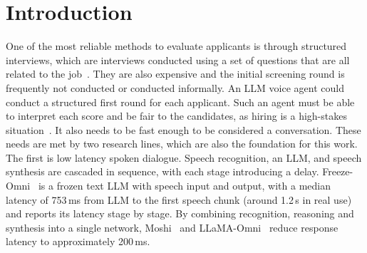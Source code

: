 \documentclass[conference]{IEEEtran}
\begin{document}
\section{Introduction}

One of the most reliable methods to evaluate applicants is through structured interviews, which are interviews conducted using a set of questions that are all related to the job~\cite{levashina2014}. They are also expensive and the initial screening round is frequently not conducted or conducted informally. An LLM voice agent could conduct a structured first round for each applicant. Such an agent must be able to interpret each score and be fair to the candidates, as hiring is a high-stakes situation~\cite{raghavan2020}. It also needs to be fast enough to be considered a conversation. These needs are met by two research lines, which are also the foundation for this work. The first is low latency spoken dialogue. Speech recognition, an LLM, and speech synthesis are cascaded in sequence, with each stage introducing a delay. Freeze-Omni~\cite{freezeomni} is a frozen text LLM with speech input and output, with a median latency of 753\,ms from LLM to the first speech chunk (around 1.2\,s in real use) and reports its latency stage by stage. By combining recognition, reasoning and synthesis into a single network, Moshi~\cite{moshi} and LLaMA-Omni~\cite{llamaomni} reduce response latency to approximately 200\,ms.
\end{document}
